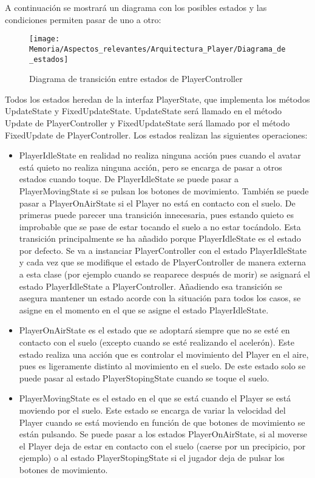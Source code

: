 A continuación se mostrará un diagrama con los posibles estados y las condiciones permiten pasar de uno a otro:

\clearpage
\begin{figure}[h]
\centering
\texttt{[image: Memoria/Aspectos\_relevantes/Arquitectura\_Player/Diagrama\_de\_estados]}
\caption{Diagrama de transición entre estados de PlayerController}
\end{figure}

Todos los estados heredan de la interfaz PlayerState, que implementa los métodos UpdateState y FixedUpdateState. UpdateState será llamado en el método Update de PlayerController y FixedUpdateState será llamado por el método FixedUpdate de PlayerController. Los estados realizan las siguientes operaciones:
\begin{itemize}
\item
PlayerIdleState en realidad no realiza ninguna acción pues cuando el avatar está quieto no realiza ninguna acción, pero se encarga de pasar a otros estados cuando toque. De PlayerIdleState se puede pasar a PlayerMovingState si se pulsan los botones de movimiento. También se puede pasar a PlayerOnAirState si el Player no está en contacto con el suelo. De primeras puede parecer una transición innecesaria, pues estando quieto es improbable que se pase de estar tocando el suelo a no estar tocándolo. Esta transición principalmente se ha añadido porque PlayerIdleState es el estado por defecto. Se va a instanciar PlayerController con el estado PlayerIdleState y cada vez que se modifique el estado de PlayerController de manera externa a esta clase (por ejemplo cuando se reaparece después de morir) se asignará el estado PlayerIdleState a PlayerController. Añadiendo esa transición se asegura mantener un estado acorde con la situación para todos los casos, se asigne en el momento en el que se asigne el estado PlayerIdleState.
\item
PlayerOnAirState es el estado que se adoptará siempre que no se esté en contacto con el suelo (excepto cuando se esté realizando el acelerón). Este estado realiza una acción que es controlar el movimiento del Player en el aire, pues es ligeramente distinto al movimiento en el suelo. De este estado solo se puede pasar al estado PlayerStopingState cuando se toque el suelo.
\item
PlayerMovingState es el estado en el que se está cuando el Player se está moviendo por el suelo. Este estado se encarga de variar la velocidad del Player cuando se está moviendo en función de que botones de movimiento se están pulsando. Se puede pasar a los estados PlayerOnAirState, si al moverse el Player deja de estar en contacto con el suelo (caerse por un precipicio, por ejemplo) o al estado PlayerStopingState si el jugador deja de pulsar los botones de movimiento.

\end{itemize}
